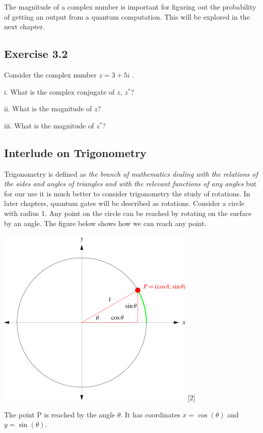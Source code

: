 \documentclass{book}
\begin{document}
 The magnitude of a complex number is important for figuring out the probability of getting an output from a quantum computation. This will be explored in the next chapter.


\subsection{Exercise 3.2}


Consider the complex number $z = 3 + 5i$ . 

i. What is the complex conjugate of $z$, $z^*$?
 
ii. What is the magnitude of $z$?

iii. What is the magnitude of $z^*$?

\subsection{ Interlude on Trigonometry } 

Trigonometry is defined as \textit{the branch of mathematics dealing with the relations of the sides and angles of triangles and with the relevant functions of any angles} but for our use it is much better to consider trigonometry the study of rotations. In later chapters, quantum gates will be described as rotations. Consider a circle with radius 1. Any point on the circle can be reached by rotating on the surface by an angle. The figure below shows how we can reach any point.

\begin{center}
    \includegraphics[scale=0.65]{images/TrigonometryUnitCircle_700.png}
    [2]
\end{center}

The point P is reached by the angle $\theta$. It has coordinates $x = \cos(\theta)$ and $ y = \sin(\theta)$.
\end{document}
